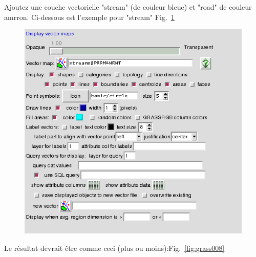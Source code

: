 Ajoutez une couche vectorielle "stream" (de couleur bleue) et "road" de couleur amrron. Ci-dessous est l'exemple pour "stream" Fig.~\ref{fig:grass007}

\begin{figure}[htbp]
   \centering
   \includegraphics[scale=0.45]{grass007.png}
   \caption{}
   \label{fig:grass007}
\end{figure}

Le r\'esultat devrait \^etre comme ceci (plus ou moins):Fig.~\ref{fig:grass008}


